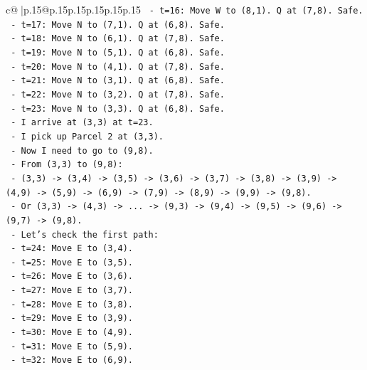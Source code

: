 \documentclass{article}
\begin{document}
{\begin{supertabular}{c@{$\;$}|p{.15\linewidth}@{}p{.15\linewidth}p{.15\linewidth}p{.15\linewidth}p{.15\linewidth}p{.15\linewidth}}
{{{\texttt{            {-}   t=16: Move W to (8,1). Q at (7,8). Safe.} \\
\texttt{            {-}   t=17: Move N to (7,1). Q at (6,8). Safe.} \\
\texttt{            {-}   t=18: Move N to (6,1). Q at (7,8). Safe.} \\
\texttt{            {-}   t=19: Move N to (5,1). Q at (6,8). Safe.} \\
\texttt{            {-}   t=20: Move N to (4,1). Q at (7,8). Safe.} \\
\texttt{            {-}   t=21: Move N to (3,1). Q at (6,8). Safe.} \\
\texttt{            {-}   t=22: Move N to (3,2). Q at (7,8). Safe.} \\
\texttt{            {-}   t=23: Move N to (3,3). Q at (6,8). Safe.} \\
\texttt{            {-}   I arrive at (3,3) at t=23.} \\
\texttt{            {-}   I pick up Parcel 2 at (3,3).} \\
\texttt{            {-}   Now I need to go to (9,8).} \\
\texttt{            {-}   From (3,3) to (9,8):} \\
\texttt{                {-}   (3,3) {-}> (3,4) {-}> (3,5) {-}> (3,6) {-}> (3,7) {-}> (3,8) {-}> (3,9) {-}> (4,9) {-}> (5,9) {-}> (6,9) {-}> (7,9) {-}> (8,9) {-}> (9,9) {-}> (9,8).} \\
\texttt{                {-}   Or (3,3) {-}> (4,3) {-}> ... {-}> (9,3) {-}> (9,4) {-}> (9,5) {-}> (9,6) {-}> (9,7) {-}> (9,8).} \\
\texttt{            {-}   Let's check the first path:} \\
\texttt{                {-}   t=24: Move E to (3,4).} \\
\texttt{                {-}   t=25: Move E to (3,5).} \\
\texttt{                {-}   t=26: Move E to (3,6).} \\
\texttt{                {-}   t=27: Move E to (3,7).} \\
\texttt{                {-}   t=28: Move E to (3,8).} \\
\texttt{                {-}   t=29: Move E to (3,9).} \\
\texttt{                {-}   t=30: Move E to (4,9).} \\
\texttt{                {-}   t=31: Move E to (5,9).} \\
\texttt{                {-}   t=32: Move E to (6,9).} \\
}}}
\end{supertabular}}
\end{document}
